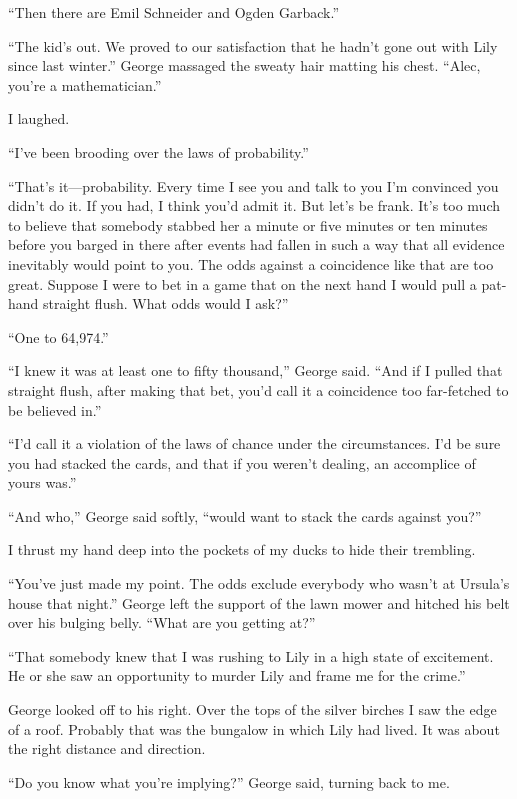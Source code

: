 \documentclass{novel}
\begin{document}
“Then there are Emil Schneider and Ogden Garback.”

“The kid’s out. We proved to our satisfaction that he hadn’t gone out with Lily since last winter.” George \mbox{massaged} the sweaty hair matting his chest. “Alec, you’re a mathematician.”

I laughed. 

“I’ve been brooding over the laws of probability.”

“That’s it—probability. Every time I see you and talk to you I’m convinced you didn’t do it. If you had, I think you’d admit it. But let’s be frank. It’s too much to believe that somebody stabbed her a minute or five minutes or ten minutes before you barged in there after events had fallen in such a way that all evidence inevitably would point to you. The odds against a coincidence like that are too great. Suppose I were to bet in a game that on the next hand I would pull a pat-hand straight flush. What odds would I ask?”

“One to 64,974.”

“I knew it was at least one to fifty thousand,” George said. “And if I pulled that straight flush, after making that bet, you’d call it a coincidence too far-fetched to be believed in.”

“I’d call it a violation of the laws of chance under the circumstances. I’d be sure you had stacked the cards, and that if you weren’t dealing, an accomplice of yours was.”

“And who,” George said softly, “would want to stack the cards against you?”

I thrust my hand deep into the pockets of my ducks to hide their trembling. 

“You’ve just made my point. The odds exclude everybody who wasn’t at Ursula’s house that night.” George left the support of the lawn mower and hitched his belt over his bulging belly. “What are you getting at?”

“That somebody knew that I was rushing to Lily in a high state of excitement. He or she saw an opportunity to murder Lily and frame me for the crime.”

\scenestars

George looked off to his right. Over the tops of the silver birches I saw the edge of a roof. Probably that was the bungalow in which Lily had lived. It was about the right distance and direction.

“Do you know what you’re implying?” George said, turning back to me.
\end{document}
